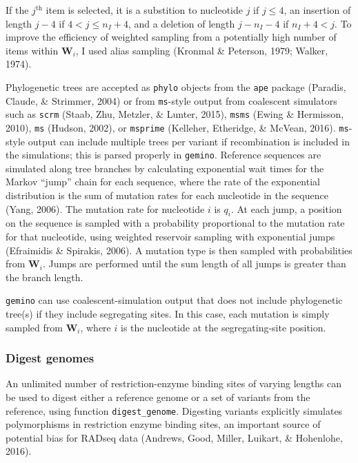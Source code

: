 \documentclass[12pt,]{article}
\begin{document}
If the \(j^{\text{th}}\) item is selected, it is a substition to
nucleotide \(j\) if \(j \le 4\), an insertion of length \(j-4\) if
\(4 < j \le n_I + 4\), and a deletion of length \(j - n_I - 4\) if
\(n_I + 4 < j\). To improve the efficiency of weighted sampling from a
potentially high number of items within \(\mathbf{W}_i\), I used alias
sampling (Kronmal \& Peterson, 1979; Walker, 1974).

Phylogenetic trees are accepted as \texttt{phylo} objects from the
\texttt{ape} package (Paradis, Claude, \& Strimmer, 2004) or from
\texttt{ms}-style output from coalescent simulators such as
\texttt{scrm} (Staab, Zhu, Metzler, \& Lunter, 2015), \texttt{msms}
(Ewing \& Hermisson, 2010), \texttt{ms} (Hudson, 2002), or
\texttt{msprime} (Kelleher, Etheridge, \& McVean, 2016).
\texttt{ms}-style output can include multiple trees per variant if
recombination is included in the simulations; this is parsed properly in
\texttt{gemino}. Reference sequences are simulated along tree branches
by calculating exponential wait times for the Markov ``jump'' chain for
each sequence, where the rate of the exponential distribution is the sum
of mutation rates for each nucleotide in the sequence (Yang, 2006). The
mutation rate for nucleotide \(i\) is \(q_i\). At each jump, a position
on the sequence is sampled with a probability proportional to the
mutation rate for that nucleotide, using weighted reservoir sampling
with exponential jumps (Efraimidis \& Spirakis, 2006). A mutation type
is then sampled with probabilities from \(\mathbf{W}_i\). Jumps are
performed until the sum length of all jumps is greater than the branch
length.

\texttt{gemino} can use coalescent-simulation output that does not
include phylogenetic tree(s) if they include segregating sites. In this
case, each mutation is simply sampled from \(\mathbf{W}_i\), where \(i\)
is the nucleotide at the segregating-site position.

\hypertarget{digest-genomes}{%
\subsubsection{Digest genomes}\label{digest-genomes}}

An unlimited number of restriction-enzyme binding sites of varying
lengths can be used to digest either a reference genome or a set of
variants from the reference, using function \texttt{digest\_genome}.
Digesting variants explicitly simulates polymorphisms in restriction
enzyme binding sites, an important source of potential bias for RADseq
data (Andrews, Good, Miller, Luikart, \& Hohenlohe, 2016).
\end{document}
